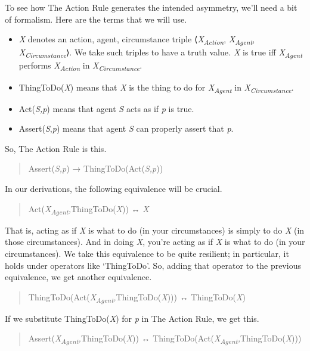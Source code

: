 \documentclass[
  11pt,
  letterpaper,
  DIV=11,
  numbers=noendperiod,
  twoside]{scrartcl}
\providecommand{\tightlist}{%
  \setlength{\itemsep}{0pt}\setlength{\parskip}{0pt}}
\begin{document}
To see how The Action Rule generates the intended asymmetry, we'll need
a bit of formalism. Here are the terms that we will use.

\begin{itemize}
\tightlist
\item
  \emph{X} denotes an action, agent, circumstance triple
  ⟨\emph{X\textsubscript{Action}}, \emph{X\textsubscript{Agent}},
  \emph{X\textsubscript{Circumstance}}⟩. We take such triples to have a
  truth value\emph{.} \emph{X} is true iff \emph{X\textsubscript{Agent}}
  performs \emph{X\textsubscript{Action}} in
  \emph{X\textsubscript{Circumstance}}.
\item
  ThingToDo(\emph{X}) means that \emph{X} is the thing to do for
  \emph{X\textsubscript{Agent}} in \emph{X\textsubscript{Circumstance}}.
\item
  Act(\emph{S,p}) means that agent \emph{S} acts as if \emph{p} is true.
\item
  Assert(\emph{S},\emph{p}) means that agent \emph{S} can properly
  assert that \emph{p}.
\end{itemize}

So, The Action Rule is this.

\begin{quote}
Assert(\emph{S,p}) → ThingToDo(Act(\emph{S,p}))
\end{quote}

In our derivations, the following equivalence will be crucial.

\begin{quote}
Act(\emph{X\textsubscript{Agent},}ThingToDo(\emph{X})) ↔ \emph{X}
\end{quote}

That is, acting as if \emph{X} is what to do (in your circumstances) is
simply to do \emph{X} (in those circumstances). And in doing \emph{X},
you're acting as if \emph{X} is what to do (in your circumstances). We
take this equivalence to be quite resilient; in particular, it holds
under operators like `ThingToDo'. So, adding that operator to the
previous equivalence, we get another equivalence.

\begin{quote}
ThingToDo(Act(\emph{X\textsubscript{Agent},}ThingToDo(\emph{X}))) ↔
ThingToDo(\emph{X})
\end{quote}

If we substitute ThingToDo(\emph{X}) for \emph{p} in The Action Rule, we
get this.

\begin{quote}
Assert(\emph{X\textsubscript{Agent},}ThingToDo(\emph{X})) ↔
ThingToDo(Act(\emph{X\textsubscript{Agent},}ThingToDo(\emph{X})))
\end{quote}
\end{document}
